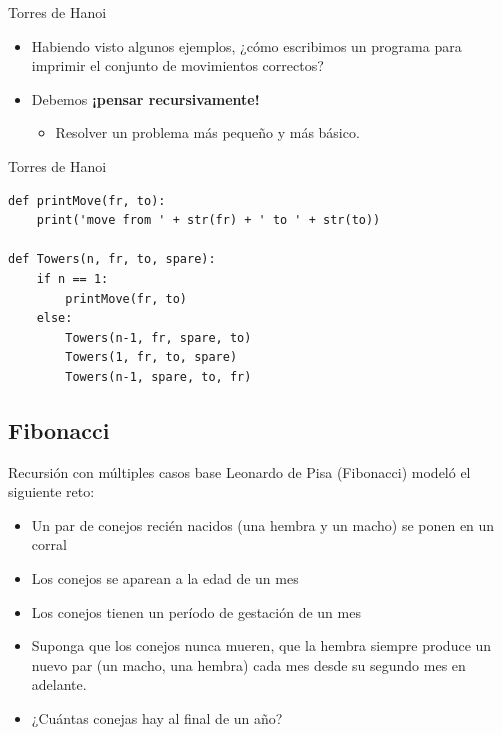 \documentclass[mathserif]{beamer}
\begin{document}
\begin{frame}[fragile]{Torres de Hanoi}
    \begin{itemize}
        \item Habiendo visto algunos ejemplos, ¿cómo escribimos un programa para imprimir el conjunto de movimientos correctos?
        
        \item Debemos {\orange\bfseries ¡pensar recursivamente!}
        \begin{itemize}
            \item Resolver un problema más pequeño y más básico.
        \end{itemize}
    \end{itemize}
\end{frame}

\begin{frame}[fragile]{Torres de Hanoi}
\begin{lstlisting}
def printMove(fr, to):
    print('move from ' + str(fr) + ' to ' + str(to))

def Towers(n, fr, to, spare):
    if n == 1:
        printMove(fr, to)
    else:
        Towers(n-1, fr, spare, to)
        Towers(1, fr, to, spare)
        Towers(n-1, spare, to, fr)
\end{lstlisting}
\end{frame}

\subsection{Fibonacci}
\begin{frame}[fragile]{Recursión con múltiples casos base}
    Leonardo de Pisa (Fibonacci) modeló el siguiente reto: 
    \begin{itemize}
        \item Un par de conejos recién nacidos (una hembra y un macho) se ponen en un corral
        \item Los conejos se aparean a la edad de un mes
        \item Los conejos tienen un período de gestación de un mes
        \item Suponga que los conejos nunca mueren, que la hembra siempre produce un nuevo par (un macho, una hembra) cada mes desde su segundo mes en adelante.
        \item ¿Cuántas conejas hay al final de un año?
    \end{itemize}
\end{frame}
\end{document}
